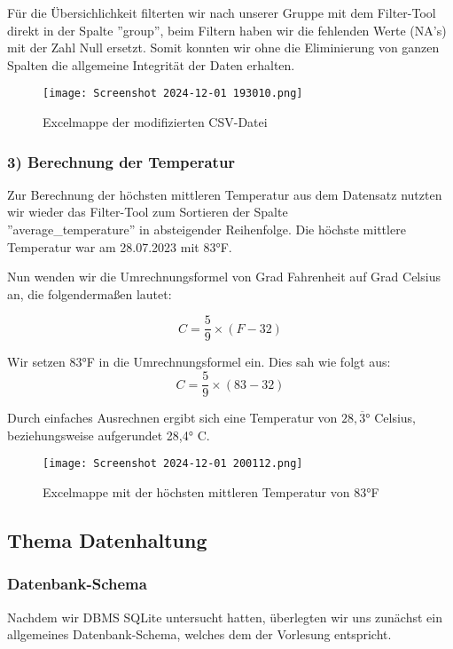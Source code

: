 \documentclass[11pt]{article}
\begin{document}
Für die Übersichlichkeit filterten wir nach unserer Gruppe mit dem Filter-Tool direkt in der Spalte ''group'', beim Filtern haben wir die fehlenden Werte (NA's) mit der Zahl Null ersetzt. Somit konnten wir ohne die Eliminierung von ganzen Spalten die allgemeine Integrität der Daten erhalten.

\begin{figure}[H]
    \centering
    \texttt{[image: Screenshot 2024-12-01 193010.png]}
    \caption{Excelmappe der modifizierten CSV-Datei}
    \label{fig:first-figure}
\end{figure}
    
\subsubsection{3) Berechnung der Temperatur}
Zur Berechnung der höchsten mittleren Temperatur aus dem Datensatz nutzten wir wieder das Filter-Tool zum Sortieren der Spalte \\''average\_temperature'' in absteigender Reihenfolge. Die höchste mittlere Temperatur war am 28.07.2023 mit 83°F. 

Nun wenden wir die Umrechnungsformel von Grad Fahrenheit auf Grad Celsius an, die folgendermaßen lautet: 
    
\[C = \frac{5}{9} \times (F - 32) \]

Wir setzen 83°F in die Umrechnungsformel ein. Dies sah wie folgt aus:
\[C = \frac{5}{9} \times (83 - 32) \]

Durch einfaches Ausrechnen ergibt sich eine Temperatur von \( 28,\overline{3} \)° Celsius, beziehungsweise aufgerundet 28,4° C.

\begin{figure}[H]
    \centering
    \texttt{[image: Screenshot 2024-12-01 200112.png]}
    \caption{Excelmappe mit der höchsten mittleren Temperatur von 83°F}
    \label{fig:second-figure}
\end{figure}

\subsection{Thema Datenhaltung}

\subsubsection{Datenbank-Schema}
Nachdem wir DBMS SQLite untersucht hatten, überlegten wir uns zunächst ein allgemeines Datenbank-Schema, welches dem der Vorlesung entspricht.
\end{document}
